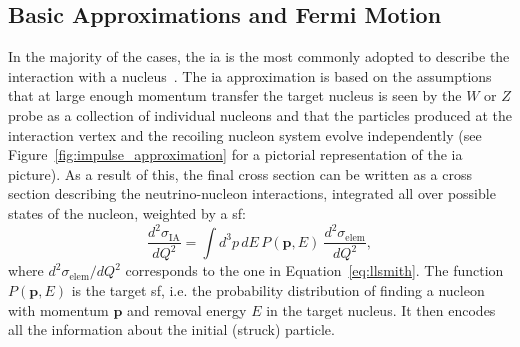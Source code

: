 \subsection{Basic Approximations and Fermi Motion}
\label{sec:fermi_motion}

In the majority of the cases, the \acrfull{ia} is the most commonly adopted to describe the interaction with a nucleus~\cite{ia_approximation}. The \acrshort{ia} approximation is based on the assumptions that at large enough momentum transfer the target nucleus is seen by the $W$ or $Z$ probe as a collection of individual nucleons and that the particles produced at the interaction vertex and the recoiling nucleon system evolve independently (see Figure~\ref{fig:impulse_approximation} for a pictorial representation of the \acrshort{ia} picture).
As a result of this, the final cross section can be written as a cross section describing the neutrino-nucleon interactions, integrated all over possible states of the nucleon, weighted by a \acrfull{sf}:
\begin{equation}
\frac{d^2\sigma_\text{IA}}{dQ^2} = \int d^3p \, dE \, P (\mathbf{p}, E)\ \frac{d^2\sigma_\text{elem}}{dQ^2},
\end{equation}
where ${d^2\sigma_\text{elem}}/{dQ^2}$ corresponds to the one in Equation~\eqref{eq:llsmith}.
The function $P (\mathbf{p}, E)$ is the target \acrshort{sf}, i.e. the probability distribution of finding a nucleon with momentum $\mathbf{p}$ and removal energy $E$ in the target nucleus. It then encodes all the information about the initial (struck) particle.


